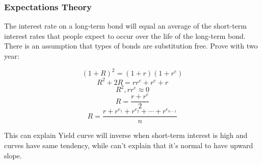 \documentclass[10pt, a4paper]{article}
\begin{document}
    \subsubsection{Expectations Theory}
        The interest rate on a long-term bond will equal an average of the short-term interest rates that people expect to occur over the life of the long-term bond. There is an assumption that types of bonds are substitution free. Prove with two year: 

        $$(1 + R)^2 = (1 + r)(1 + r^e)$$
        $$R^2 + 2R = rr^e + r^e + r$$
        $$R^2, rr^e \approx 0$$
        $$R = \frac{r + r^e}{2}$$
        $$R = \frac{r + r^{e_1} + r^{e_2} + \cdots + r^{e_{n - 1}}}{n}$$

        This can explain Yield curve will inverse when short-term interest is high and curves have same tendency, while can't explain that it's normal to have upward slope. 
    
\end{document}

